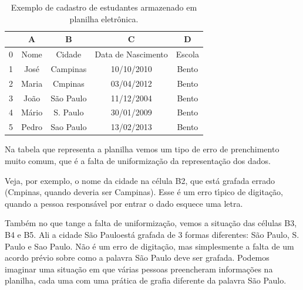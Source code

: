 \documentclass[
12pt,		%
openright,	%
twoside,  %
a4paper,			%
chapter=TITLE,		%
english,			%
french,				%
spanish,			%
brazil				%
]{USPSC-classe/USPSC}
\begin{document}
\begin{table}[htb]
\tiny
\caption{\label{ddd7a335bbc10f88eaaf4abda266d151f0ba0e6f}Exemplo de cadastro de estudantes armazenado em planilha eletr\^onica.}

\centering
\begin{tabular}{|c|c|c|c|c|}
\hline
  &  A  &  B  &  C  &  D  \\
\hline
0 & Nome  &  Cidade  &  Data de Nascimento  &  Escola \\
1 & Jos\'e  &  Campinas  &  10/10/2010  &  Bento \\
2 & Maria  &  Cmpinas  &  03/04/2012  &  Bento \\
3 & Jo\~ao  &  S\~ao Paulo  &  11/12/2004  &  Bento \\
4 & M\'ario  &  S. Paulo  &  30/01/2009  &  Bento \\
5 & Pedro  &  Sao Paulo  &  13/02/2013  &  Bento \\
\hline
\end{tabular}
\end{table}


Na tabela que representa a planilha vemos um tipo de erro de prenchimento muito comum, que \'e a falta de uniformiza\c{c}\~ao da representa\c{c}\~ao dos dados.

















Veja, por exemplo, o nome da cidade na c\'elula B2, que est\'a grafada errado (Cmpinas, quando deveria ser Campinas). Esse \'e um erro t\'{\i}pico de digita\c{c}\~ao, quando a pessoa respons\'avel por entrar o dado esquece uma letra.

















Tamb\'em no que tange a falta de uniformiza\c{c}\~ao, vemos a situa\c{c}\~ao das c\'elulas B3, B4 e B5. Ali a cidade \textquotedbl S\~ao Paulo\textquotedbl  est\'a grafada de 3 formas diferentes: S\~ao Paulo, S. Paulo e Sao Paulo. N\~ao \'e um erro de digita\c{c}\~ao, mas simplesmente a falta de um acordo pr\'evio sobre como a palavra S\~ao Paulo deve ser grafada. Podemos imaginar uma situa\c{c}\~ao em que v\'arias pessoas preencheram informa\c{c}\~oes na planilha, cada uma com uma pr\'atica de grafia diferente da palavra S\~ao Paulo.
\end{document}
